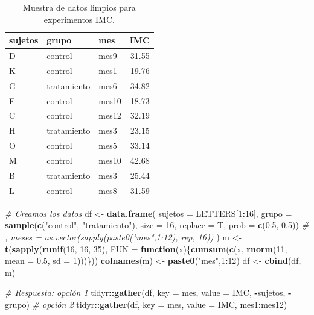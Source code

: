 \documentclass[]{article}
\newenvironment{Shaded}{\begin{snugshade}}{\end{snugshade}}
\newcommand{\KeywordTok}[1]{\textcolor[rgb]{0.13,0.29,0.53}{\textbf{#1}}}
\newcommand{\DataTypeTok}[1]{\textcolor[rgb]{0.13,0.29,0.53}{#1}}
\newcommand{\DecValTok}[1]{\textcolor[rgb]{0.00,0.00,0.81}{#1}}
\newcommand{\FloatTok}[1]{\textcolor[rgb]{0.00,0.00,0.81}{#1}}
\newcommand{\StringTok}[1]{\textcolor[rgb]{0.31,0.60,0.02}{#1}}
\newcommand{\CommentTok}[1]{\textcolor[rgb]{0.56,0.35,0.01}{\textit{#1}}}
\newcommand{\ControlFlowTok}[1]{\textcolor[rgb]{0.13,0.29,0.53}{\textbf{#1}}}
\newcommand{\OperatorTok}[1]{\textcolor[rgb]{0.81,0.36,0.00}{\textbf{#1}}}
\newcommand{\NormalTok}[1]{#1}
\begin{document}
\begin{table}[H]
\centering
\begin{tabular}{lllr}
  \hline
sujetos & grupo & mes & IMC \\ 
  \hline
D & control & mes9 & 31.55 \\ 
  K & control & mes1 & 19.76 \\ 
  G & tratamiento & mes6 & 34.82 \\ 
  E & control & mes10 & 18.73 \\ 
  C & control & mes12 & 32.19 \\ 
  H & tratamiento & mes3 & 23.15 \\ 
  O & control & mes5 & 33.14 \\ 
  M & control & mes10 & 42.68 \\ 
  B & tratamiento & mes3 & 25.44 \\ 
  L & control & mes8 & 31.59 \\ 
   \hline
\end{tabular}
\caption{Muestra de datos limpios para experimentos IMC.} 
\label{tab:sujetostidy}
\end{table}

\begin{Shaded}
\begin{Highlighting}[]
\CommentTok{# Creamos los datos}
\NormalTok{df <-}\StringTok{ }\KeywordTok{data.frame}\NormalTok{(}
  \DataTypeTok{sujetos =}\NormalTok{ LETTERS[}\DecValTok{1}\OperatorTok{:}\DecValTok{16}\NormalTok{],}
  \DataTypeTok{grupo =} \KeywordTok{sample}\NormalTok{(}\KeywordTok{c}\NormalTok{(}\StringTok{"control"}\NormalTok{, }\StringTok{"tratamiento"}\NormalTok{), }\DataTypeTok{size =} \DecValTok{16}\NormalTok{, }\DataTypeTok{replace =}\NormalTok{ T, }\DataTypeTok{prob =} \KeywordTok{c}\NormalTok{(}\FloatTok{0.5}\NormalTok{, }\FloatTok{0.5}\NormalTok{))}
  \CommentTok{# ,  meses = as.vector(sapply(paste0("mes",1:12), rep, 16))}
\NormalTok{  )}
\NormalTok{m <-}\StringTok{ }\KeywordTok{t}\NormalTok{(}\KeywordTok{sapply}\NormalTok{(}\KeywordTok{runif}\NormalTok{(}\DecValTok{16}\NormalTok{, }\DecValTok{16}\NormalTok{, }\DecValTok{35}\NormalTok{), }\DataTypeTok{FUN =} \ControlFlowTok{function}\NormalTok{(x)\{}\KeywordTok{cumsum}\NormalTok{(}\KeywordTok{c}\NormalTok{(x, }\KeywordTok{rnorm}\NormalTok{(}\DecValTok{11}\NormalTok{, }\DataTypeTok{mean =} \FloatTok{0.5}\NormalTok{, }\DataTypeTok{sd =} \DecValTok{1}\NormalTok{)))\}))}
\KeywordTok{colnames}\NormalTok{(m) <-}\StringTok{ }\KeywordTok{paste0}\NormalTok{(}\StringTok{"mes"}\NormalTok{,}\DecValTok{1}\OperatorTok{:}\DecValTok{12}\NormalTok{)}
\NormalTok{df <-}\StringTok{ }\KeywordTok{cbind}\NormalTok{(df, m)}

\CommentTok{# Respuesta: opción 1}
\NormalTok{tidyr}\OperatorTok{::}\KeywordTok{gather}\NormalTok{(df, }\DataTypeTok{key =}\NormalTok{ mes, }\DataTypeTok{value =}\NormalTok{ IMC, }\OperatorTok{-}\NormalTok{sujetos, }\OperatorTok{-}\NormalTok{grupo)}
\CommentTok{# opción 2}
\NormalTok{tidyr}\OperatorTok{::}\KeywordTok{gather}\NormalTok{(df, }\DataTypeTok{key =}\NormalTok{ mes, }\DataTypeTok{value =}\NormalTok{ IMC, mes1}\OperatorTok{:}\NormalTok{mes12)}
\end{Highlighting}
\end{Shaded}
\end{document}
